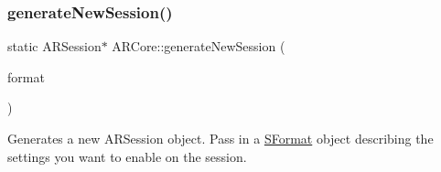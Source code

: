 \subsubsection{\texorpdfstring{generate\+New\+Session()}{generateNewSession()}}
{\footnotesize\ttfamily static A\+R\+Session$\ast$ A\+R\+Core\+::generate\+New\+Session (\begin{DoxyParamCaption}\item[{\hyperlink{class_a_r_core_1_1_s_format}{S\+Format}}]{format }\end{DoxyParamCaption})\hspace{0.3cm}{\ttfamily [static]}}

Generates a new A\+R\+Session object. Pass in a \hyperlink{class_a_r_core_1_1_s_format}{S\+Format} object describing the settings you want to enable on the session. 